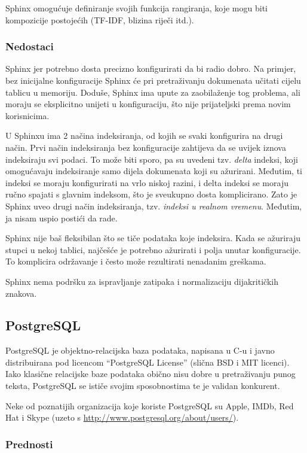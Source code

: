\documentclass[a4paper,twoside,12pt]{scrreprt}
\begin{document}
Sphinx omogućuje definiranje svojih funkcija rangiranja, koje mogu biti kompozicije postojećih (TF-IDF, blizina riječi itd.).

\subsubsection{Nedostaci}

Sphinx jer potrebno dosta precizno konfigurirati da bi radio dobro. Na primjer, bez inicijalne konfiguracije Sphinx će pri pretraživanju dokumenata učitati cijelu tablicu u memoriju. Doduše, Sphinx ima upute za zaobilaženje tog problema, ali moraju se eksplicitno unijeti u konfiguraciju, što nije prijateljski prema novim korisnicima.

U Sphinxu ima 2 načina indeksiranja, od kojih se svaki konfigurira na drugi način. Prvi način indeksiranja bez konfiguracije zahtijeva da se uvijek iznova indeksiraju svi podaci. To može biti sporo, pa su uvedeni tzv. \textit{delta} indeksi, koji omogućavaju indeksiranje samo dijela dokumenata koji su ažurirani. Međutim, ti indeksi se moraju konfigurirati na vrlo niskoj razini, i delta indeksi se moraju ručno spajati s glavnim indeksom, što je sveukupno dosta komplicirano. Zato je Sphinx uveo drugi način indeksiranja, tzv. \textit{indeksi u realnom vremenu}. Međutim, ja nisam uspio postići da rade.

Sphinx nije baš fleksibilan što se tiče podataka koje indeksira. Kada se ažuriraju stupci u nekoj tablici, najčešće je potrebno ažurirati i polja unutar konfiguracije. To komplicira održavanje i često može rezultirati nenadanim greškama.

Sphinx nema podršku za ispravljanje zatipaka i normalizaciju dijakritičkih znakova.

\subsection{PostgreSQL}

PostgreSQL je objektno-relacijska baza podataka, napisana u C-u i javno distribuirana pod licencom ``PostgreSQL License'' (slična BSD i MIT licenci). Iako klasične relacijske baze podataka obično nisu dobre u pretraživanju punog teksta, PostgreSQL se ističe svojim sposobnostima te je validan konkurent.

Neke od poznatijih organizacija koje koriste PostgreSQL su Apple, IMDb, Red Hat i Skype (uzeto s \url{http://www.postgresql.org/about/users/}).

\subsubsection{Prednosti}
\end{document}

